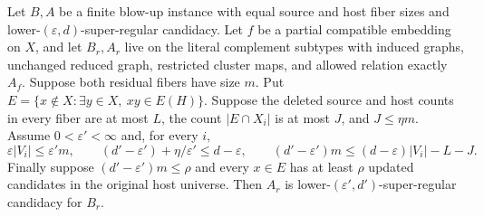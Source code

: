 \begin{lemma}
Let $B,A$ be a finite blow-up instance with equal source and host fiber
sizes and lower-$(\varepsilon,d)$-super-regular candidacy. Let $f$ be a
partial compatible embedding on $X$, and let $B_r,A_r$ live on the
literal complement subtypes with induced graphs, unchanged reduced
graph, restricted cluster maps, and allowed relation exactly $A_f$.
Suppose both residual fibers have size $m$. Put
$E=\{x\notin X:\exists y\in X,\ xy\in E(H)\}$.
Suppose the deleted source and host counts in every fiber are at most
$L$, the count $|E\cap X_i|$ is at most $J$, and $J\leq\eta m$.
Assume $0<\varepsilon'<\infty$ and, for every $i$,
\[
 \varepsilon|V_i|\leq\varepsilon'm,\qquad
 (d'-\varepsilon')+\eta/\varepsilon'\leq d-\varepsilon,\qquad
 (d'-\varepsilon')m\leq(d-\varepsilon)|V_i|-L-J.
\]
Finally suppose $(d'-\varepsilon')m\leq\rho$ and every $x\in E$ has
at least $\rho$ updated candidates in the original host universe.
Then $A_r$ is lower-$(\varepsilon',d')$-super-regular candidacy for $B_r$.
\end{lemma}

